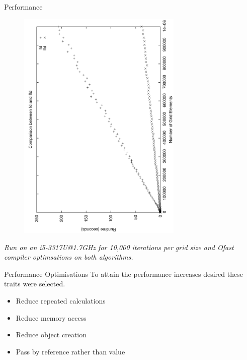\documentclass{beamer}
\begin{document}
\begin{frame}{Performance}
    \begin{figure}
        \includegraphics[angle=-90,width=0.7\textwidth]{fd_ffd_comparison.pdf}
    \end{figure}
    \em{Run on an i5-3317U@1.7GHz for 10,000 iterations per grid size and Ofast compiler optimsations on both algorithms.}
\end{frame}

\begin{frame}{Performance Optimisations}
    To attain the performance increases desired these traits were selected.
    \begin{itemize}
        \item Reduce repeated calculations
        \item Reduce memory access
        \item Reduce object creation
        \item Pass by reference rather than value
    \end{itemize}
\end{frame}
\end{document}
